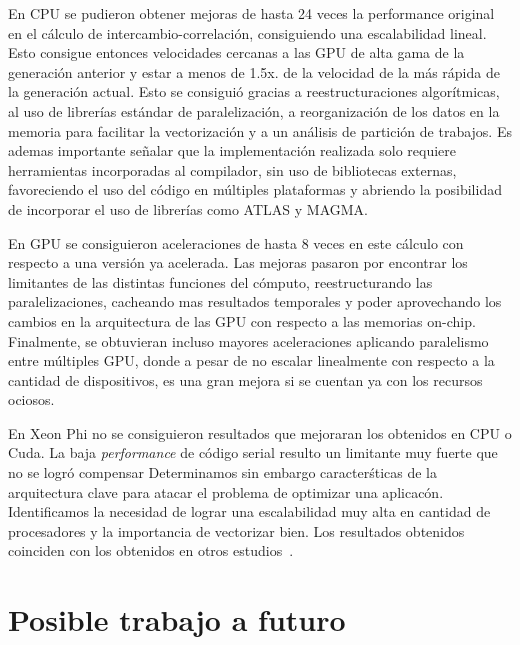 En CPU se pudieron obtener mejoras de hasta 24 veces la performance original en el c\'alculo de intercambio-correlaci\'on,
consiguiendo una escalabilidad lineal. Esto consigue entonces velocidades cercanas a las GPU de alta gama
de la generaci\'on anterior y estar a menos de 1.5x. de la velocidad de la m\'as r\'apida de la generaci\'on actual.
Esto se consigui\'o gracias a reestructuraciones algor\'itmicas, al uso de librer\'ias est\'andar de paralelizaci\'on,
a reorganizaci\'on de los datos en la memoria para facilitar la vectorizaci\'on y a un an\'alisis de partici\'on de trabajos.
Es ademas importante se\~nalar que la implementaci\'on realizada solo requiere herramientas incorporadas al compilador,
sin uso de bibliotecas externas, favoreciendo el uso del c\'odigo en m\'ultiples plataformas y abriendo la posibilidad
de incorporar el uso de librer\'ias como ATLAS y MAGMA.

En GPU se consiguieron aceleraciones de hasta 8 veces en este c\'alculo con respecto a una versi\'on ya acelerada.
Las mejoras pasaron por encontrar los limitantes de las distintas funciones del c\'omputo, reestructurando las paralelizaciones,
cacheando mas resultados temporales y poder aprovechando los cambios en la arquitectura de las GPU con respecto a las memorias
on-chip. Finalmente, se obtuvieran incluso mayores aceleraciones aplicando paralelismo entre m\'ultiples
GPU, donde a pesar de no escalar linealmente con respecto a la cantidad de dispositivos, es una gran mejora
si se cuentan ya con los recursos ociosos.

En Xeon Phi no se consiguieron resultados que mejoraran los obtenidos en CPU o
Cuda. La baja \textit{performance} de c\'odigo serial resulto un limitante muy
fuerte que no se logr\'o compensar Determinamos sin embargo caracter\'sticas
de la arquitectura clave para atacar el problema de optimizar una aplicac\'on.
Identificamos la necesidad de lograr una escalabilidad muy alta en cantidad de
procesadores y la importancia de vectorizar bien.  Los resultados obtenidos
coinciden con los obtenidos en otros estudios~\cite{XeonPhiMatMult}.

\section{Posible trabajo a futuro}

